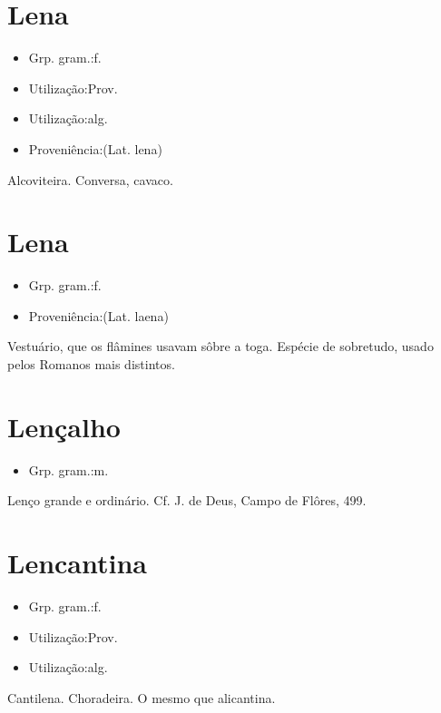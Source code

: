 \section{Lena}
\begin{itemize}
\item {Grp. gram.:f.}
\end{itemize}
\begin{itemize}
\item {Utilização:Prov.}
\end{itemize}
\begin{itemize}
\item {Utilização:alg.}
\end{itemize}
\begin{itemize}
\item {Proveniência:(Lat. \textunderscore lena\textunderscore )}
\end{itemize}
Alcoviteira.
Conversa, cavaco.
\section{Lena}
\begin{itemize}
\item {Grp. gram.:f.}
\end{itemize}
\begin{itemize}
\item {Proveniência:(Lat. \textunderscore laena\textunderscore )}
\end{itemize}
Vestuário, que os flâmines usavam sôbre a toga.
Espécie de sobretudo, usado pelos Romanos mais distintos.
\section{Lençalho}
\begin{itemize}
\item {Grp. gram.:m.}
\end{itemize}
Lenço grande e ordinário. Cf. J. de Deus, \textunderscore Campo de Flôres\textunderscore , 499.
\section{Lencantina}
\begin{itemize}
\item {Grp. gram.:f.}
\end{itemize}
\begin{itemize}
\item {Utilização:Prov.}
\end{itemize}
\begin{itemize}
\item {Utilização:alg.}
\end{itemize}
Cantilena.
Choradeira.
O mesmo que \textunderscore alicantina\textunderscore .

